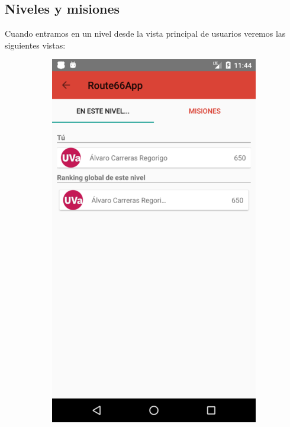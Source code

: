 \documentclass[twoside]{report}
\begin{document}
\subsection{Niveles y misiones}
Cuando entramos en un nivel desde la vista principal de usuarios veremos las siguientes vistas:
\begin{figure}[H]
\begin{center}
	\begin{subfigure}[t]{.3\linewidth}
		\includegraphics[scale=0.25]{images/userguide/23.png}

\end{subfigure}
\end{center}
\end{figure}
\end{document}
